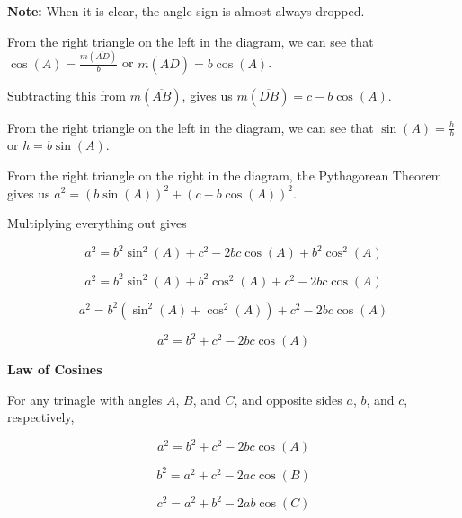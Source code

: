 \documentclass{ximera}
\begin{document}
\textbf{Note:} When it is clear, the angle sign is almost always dropped. 


From the right triangle on the left in the diagram, we can see that $\cos(A) = \frac{m(\overline{AD})}{b}$ or $m(\overline{AD}) = b \cos(A)$.


Subtracting this from $m(\overline{AB})$, gives us $m(\overline{DB}) = c - b \cos(A)$.


From the right triangle on the left in the diagram, we can see that $\sin(A) = \frac{h}{b}$ or $h = b \sin(A)$.




From the right triangle on the right in the diagram, the Pythagorean Theorem gives us $a^2 = (b \sin(A))^2 + (c - b \cos(A))^2$.


Multiplying everything out gives


\[    a^2 = b^2 \sin^2(A) +  c^2  - 2 b c \cos(A) + b^2 \cos^2(A)  \]


\[    a^2 = b^2 \sin^2(A) + b^2 \cos^2(A) +  c^2  - 2 b c \cos(A)   \]


\[    a^2 = b^2 (\sin^2(A) + \cos^2(A)) +  c^2  - 2 b c \cos(A)   \]


\[    a^2 = b^2  +  c^2  - 2 b c \cos(A)   \]












\begin{theorem}  \textbf{\textcolor{-red!75!green}{Law of Cosines}}  



For any trinagle with angles $A$, $B$, and $C$, and opposite sides $a$, $b$, and $c$, respectively, 


\[    a^2 = b^2  +  c^2  - 2 b c \cos(A)   \]

\[    b^2 = a^2  +  c^2  - 2 a c \cos(B)   \]

\[    c^2 = a^2  +  b^2  - 2 a b \cos(C)   \]


\end{theorem}
\end{document}
